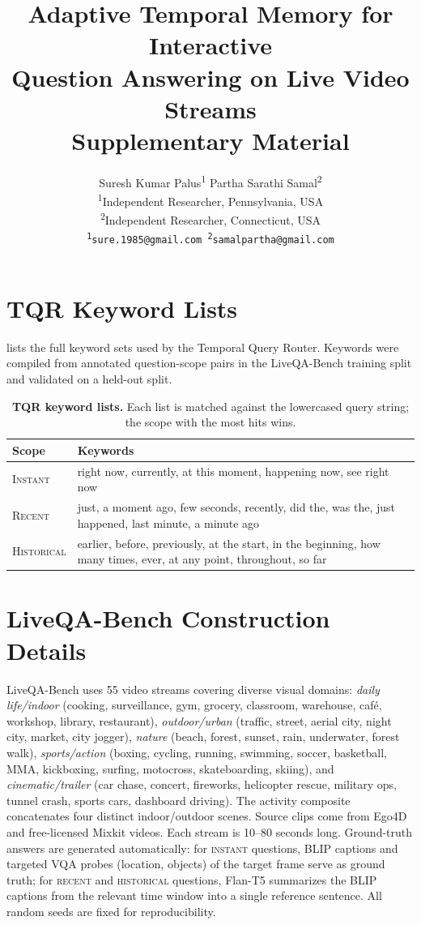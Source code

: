 \documentclass[10pt,twocolumn,letterpaper]{article}
\title{Adaptive Temporal Memory for Interactive \\ Question Answering on Live Video Streams \\ {\large Supplementary Material}}
\author{
Suresh Kumar Palus\textsuperscript{1} \qquad Partha Sarathi Samal\textsuperscript{2}\\[4pt]
\textsuperscript{1}Independent Researcher, Pennsylvania, USA\\
\textsuperscript{2}Independent Researcher, Connecticut, USA\\[2pt]
{\tt\small \textsuperscript{1}sure.1985@gmail.com \quad \textsuperscript{2}samalpartha@gmail.com}
}
\begin{document}
\maketitle

\section{TQR Keyword Lists}
\label{sec:suppl_tqr}

 lists the full keyword sets used by the Temporal Query Router. Keywords were compiled from annotated question-scope pairs in the LiveQA-Bench training split and validated on a held-out split.

\begin{table}[h]
  \caption{\textbf{TQR keyword lists.} Each list is matched against the lowercased query string; the scope with the most hits wins.}
  \label{tab:tqr_keywords}
  \centering
  \small
  \begin{tabular}{@{}lp{5.8cm}@{}}
    \toprule
    Scope & Keywords \\
    \midrule
    \textsc{Instant} & right now, currently, at this moment, happening now, see right now \\[3pt]
    \textsc{Recent} & just, a moment ago, few seconds, recently, did the, was the, just happened, last minute, a minute ago \\[3pt]
    \textsc{Historical} & earlier, before, previously, at the start, in the beginning, how many times, ever, at any point, throughout, so far \\
    \bottomrule
  \end{tabular}
\end{table}

\section{LiveQA-Bench Construction Details}
\label{sec:suppl_liveqa}

LiveQA-Bench uses 55 video streams covering diverse visual domains:
\emph{daily life/indoor} (cooking, surveillance, gym, grocery, classroom, warehouse, caf\'{e}, workshop, library, restaurant),
\emph{outdoor/urban} (traffic, street, aerial city, night city, market, city jogger),
\emph{nature} (beach, forest, sunset, rain, underwater, forest walk),
\emph{sports/action} (boxing, cycling, running, swimming, soccer, basketball, MMA, kickboxing, surfing, motocross, skateboarding, skiing),
and \emph{cinematic/trailer} (car chase, concert, fireworks, helicopter rescue, military ops, tunnel crash, sports cars, dashboard driving).
The activity composite concatenates four distinct indoor/outdoor scenes.
Source clips come from Ego4D~\cite{grauman2022ego4d} and free-licensed Mixkit videos.
Each stream is 10--80 seconds long.
Ground-truth answers are generated automatically: for \textsc{instant} questions, BLIP captions and targeted VQA probes (location, objects) of the target frame serve as ground truth; for \textsc{recent} and \textsc{historical} questions, Flan-T5 summarizes the BLIP captions from the relevant time window into a single reference sentence.
All random seeds are fixed for reproducibility.
\end{document}
